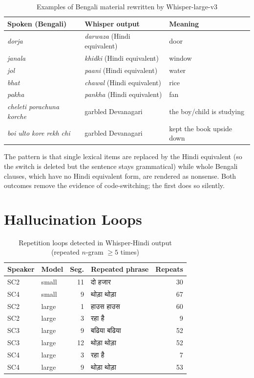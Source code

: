 \documentclass[11pt,a4paper]{report}
\newcommand{\deva}[1]{{\devafont #1}}
\newcommand{\deva}[1]{\textit{[Devanagari]}}
\begin{document}
\begin{table}[H]
\centering
\caption{Examples of Bengali material rewritten by Whisper-large-v3}
\label{tab:rewrite}
\begin{tabular}{lll}
\toprule
\textbf{Spoken (Bengali)} & \textbf{Whisper output} & \textbf{Meaning} \\
\midrule
\textit{dorja} & \textit{darwaza} (Hindi equivalent) & door \\
\textit{janala} & \textit{khidki} (Hindi equivalent) & window \\
\textit{jol} & \textit{paani} (Hindi equivalent) & water \\
\textit{bhat} & \textit{chawal} (Hindi equivalent) & rice \\
\textit{pakha} & \textit{pankha} (Hindi equivalent) & fan \\
\textit{cheleti porachuna korche} & garbled Devanagari & the boy/child is studying \\
\textit{boi ulto kore rekh chi} & garbled Devanagari & kept the book upside down \\
\bottomrule
\end{tabular}
\end{table}

The pattern is that single lexical items are replaced by the Hindi equivalent (so the switch is deleted but the sentence stays grammatical) while whole Bengali clauses, which have no Hindi equivalent form, are rendered as nonsense. Both outcomes remove the evidence of code-switching; the first does so silently.

\section{Hallucination Loops}

\begin{table}[H]
\centering
\caption{Repetition loops detected in Whisper-Hindi output (repeated $n$-gram $\geq 5$ times)}
\label{tab:hall}
\begin{tabular}{llrlr}
\toprule
\textbf{Speaker} & \textbf{Model} & \textbf{Seg.} & \textbf{Repeated phrase} & \textbf{Repeats} \\
\midrule
SC2 & small & 11 & \deva{दो हजार} & 30 \\
SC4 & small &  9 & \deva{थोड़ा थोड़ा} & 67 \\
SC2 & large &  1 & \deva{हाउस हाउस} & 60 \\
SC2 & large &  3 & \deva{रहा है} & 9 \\
SC3 & large &  9 & \deva{बढिया बढिया} & 52 \\
SC3 & large & 12 & \deva{थोड़ा थोड़ा} & 52 \\
SC4 & large &  3 & \deva{रहा है} & 7 \\
SC4 & large &  9 & \deva{थोड़ा थोड़ा} & 53 \\
\bottomrule
\end{tabular}
\end{table}
\end{document}
